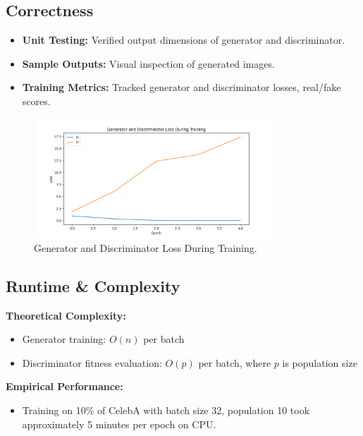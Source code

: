 \documentclass[12pt]{article}
\begin{document}
\subsection{Correctness}
\begin{itemize}
    \item \textbf{Unit Testing:} Verified output dimensions of generator and discriminator.
    \item \textbf{Sample Outputs:} Visual inspection of generated images.
    \item \textbf{Training Metrics:} Tracked generator and discriminator losses, real/fake scores.
\end{itemize}
\begin{figure}[h!]
\centering
\includegraphics[width=0.8\textwidth]{gagan_loss_plot.png}
\caption{Generator and Discriminator Loss During Training.}
\label{fig:loss_curve}
\end{figure}


\subsection{Runtime \& Complexity}
\textbf{Theoretical Complexity:}
\begin{itemize}
    \item Generator training: $O(n)$ per batch
    \item Discriminator fitness evaluation: $O(p)$ per batch, where $p$ is population size
\end{itemize}

\textbf{Empirical Performance:}
\begin{itemize}
    \item Training on 10\% of CelebA with batch size 32, population 10 took approximately 5 minutes per epoch on CPU.
\end{itemize}
\end{document}
